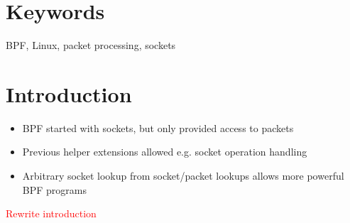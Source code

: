 \documentclass[10pt,sigconf,authorversion]{lpc}
\newcommand\todo[1]{\textcolor{red}{#1}}
\begin{document}
\section{Keywords}

BPF, Linux, packet processing, sockets

\section{Introduction}

\begin{itemize}
\item BPF started with sockets, but only provided access to packets
\item Previous helper extensions allowed e.g. socket operation handling
\item Arbitrary socket lookup from socket/packet lookups allows more powerful
      BPF programs
\end{itemize}

\todo{Rewrite introduction}



\end{document}
